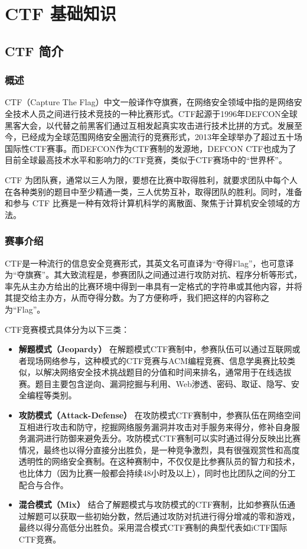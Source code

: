 \chapter{CTF 基础知识}
\section{CTF 简介}
\subsection{概述}
\indent \setlength{\parindent}{2em}
\indent CTF（Capture The Flag）中文一般译作夺旗赛，在网络安全领域中指的是网络安全技术人员之间进行技术竞技的一种比赛形式。CTF起源于1996年DEFCON全球黑客大会，以代替之前黑客们通过互相发起真实攻击进行技术比拼的方式。发展至今，已经成为全球范围网络安全圈流行的竞赛形式，2013年全球举办了超过五十场国际性CTF赛事。而DEFCON作为CTF赛制的发源地，DEFCON CTF也成为了目前全球最高技术水平和影响力的CTF竞赛，类似于CTF赛场中的“世界杯”。

\indent CTF 为团队赛，通常以三人为限，要想在比赛中取得胜利，就要求团队中每个人在各种类别的题目中至少精通一类，三人优势互补，取得团队的胜利。同时，准备和参与 CTF 比赛是一种有效将计算机科学的离散面、聚焦于计算机安全领域的方法。

\subsection{赛事介绍}
\indent \setlength{\parindent}{2em}

\indent CTF是一种流行的信息安全竞赛形式，其英文名可直译为“夺得Flag”，也可意译为“夺旗赛”。其大致流程是，参赛团队之间通过进行攻防对抗、程序分析等形式，率先从主办方给出的比赛环境中得到一串具有一定格式的字符串或其他内容，并将其提交给主办方，从而夺得分数。为了方便称呼，我们把这样的内容称之为“Flag”。

\indent CTF竞赛模式具体分为以下三类：
\begin{itemize}
    \item \textbf{解题模式（Jeopardy）} 
    \indent 在解题模式CTF赛制中，参赛队伍可以通过互联网或者现场网络参与，这种模式的CTF竞赛与ACM编程竞赛、信息学奥赛比较类似，以解决网络安全技术挑战题目的分值和时间来排名，通常用于在线选拔赛。题目主要包含逆向、漏洞挖掘与利用、Web渗透、密码、取证、隐写、安全编程等类别。
    
    \item \textbf{攻防模式（Attack-Defense）}
    \indent 在攻防模式CTF赛制中，参赛队伍在网络空间互相进行攻击和防守，挖掘网络服务漏洞并攻击对手服务来得分，修补自身服务漏洞进行防御来避免丢分。攻防模式CTF赛制可以实时通过得分反映出比赛情况，最终也以得分直接分出胜负，是一种竞争激烈，具有很强观赏性和高度透明性的网络安全赛制。在这种赛制中，不仅仅是比参赛队员的智力和技术，也比体力（因为比赛一般都会持续48小时及以上），同时也比团队之间的分工配合与合作。
    
    \item \textbf{混合模式（Mix）}
    \indent 结合了解题模式与攻防模式的CTF赛制，比如参赛队伍通过解题可以获取一些初始分数，然后通过攻防对抗进行得分增减的零和游戏，最终以得分高低分出胜负。采用混合模式CTF赛制的典型代表如iCTF国际CTF竞赛。
\end{itemize}


